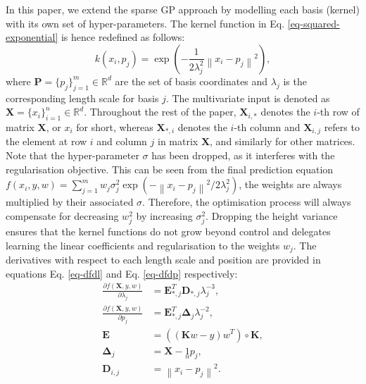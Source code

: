 \documentclass[useAMS,usenatbib,fleqn]{mn2e}
\newcommand{\bm}[1]{\mathbf{#1} }
\begin{document}
In this paper, we extend the sparse GP approach by modelling each basis (kernel) with its own set of hyper-parameters. The kernel function in Eq. \eqref{eq-squared-exponential} is hence redefined as follows:
\begin{equation}
\label{eq-squared-exponential-extension}
k(x_{i},p_{j}) = \exp{\left(-\frac{1}{2\lambda_{j}^{2}}\left\| x_{i}-p_{j}\right\|^{2}\right)},
\end{equation}
where $\bm{P}=\{p_{j}\}_{j=1}^{m} \in \mathbb{R}^{d}$ are the set of basis coordinates and $\lambda_{j}$ is the corresponding length scale for basis $j$. The multivariate input is denoted as $\bm{X}=\{x_{i}\}_{i=1}^{n} \in \mathbb{R}^{d}$. Throughout the rest of the paper, $\bm{X}_{i,*}$ denotes the $i$-th row of matrix $\bm{X}$, or $x_{i}$ for short, whereas $\bm{X}_{*,i}$ denotes the $i$-th column and $\bm{X}_{i,j}$ refers to the element at row $i$ and column $j$ in matrix $\bm{X}$, and similarly for other matrices. Note that the hyper-parameter $\sigma$ has been dropped, as it interferes with the regularisation objective. This can be seen from the final prediction equation $f(x_{i},y,w)=\sum_{j=1}^{m}w_{j}\sigma_{j}^{2}\exp{\left(-\left\| x_{i}-p_{j}\right\|^{2}/2\lambda_{j}^{2}\right)}$, the weights are always multiplied by their associated $\sigma$. Therefore, the optimisation process will always compensate for decreasing $w_{j}^{2}$ by increasing $\sigma_{j}^{2}$. Dropping the height variance ensures that the kernel functions do not grow beyond control and delegates learning the linear coefficients and regularisation to the weights $w_{j}$. The derivatives with respect to each length scale and position are provided in equations Eq. \eqref{eq-dfdl} and Eq. \eqref{eq-dfdp} respectively:
\begin{subequations}
\begin{align}
\label{eq-dfdl}
\frac{\partial f(\bm{X},y,w)}{\partial \lambda_{j}} &=\bm{E}_{*,j}^{T}\bm{D}_{*,j}\lambda_{j}^{-3},\\
\label{eq-dfdp}
\frac{\partial f(\bm{X},y,w)}{\partial p_{j}} &=\bm{E}_{*,j}^{T}\bm{\Delta}_{j}\lambda_{j}^{-2},\\
\bm{E}\phantom{_{i,j}} &= \left(\left(\bm{K}w-y\right)w^{T}\right)\circ\bm{K},\\
\bm{\Delta}_{j\phantom{,i}} &= \bm{X}-\underset{n}{1}p_{j},\\
\bm{D}_{i,j} &= \left \| x_{i}-p_{j}\right\|^{2}.
\end{align}
\end{subequations}
\end{document}
